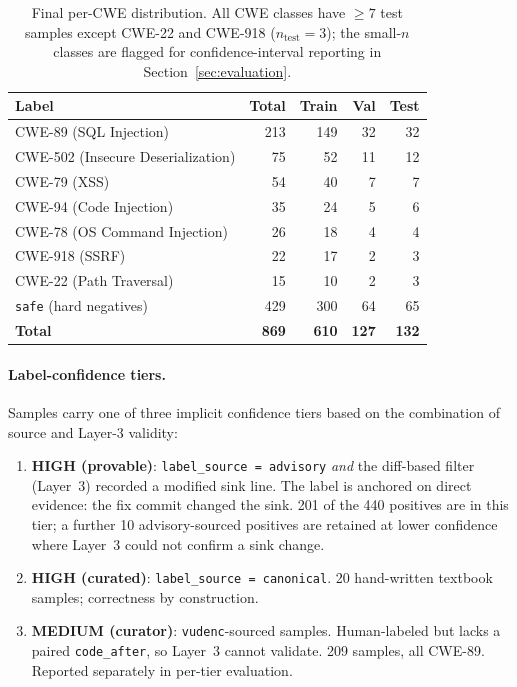\begin{table}[h]
\centering
\caption{Final per-CWE distribution. All CWE classes have $\ge 7$
test samples except CWE-22 and CWE-918 ($n_{\text{test}}=3$); the
small-$n$ classes are flagged for confidence-interval reporting in
Section~\ref{sec:evaluation}.}
\label{tab:per-cwe-counts}
\begin{tabular}{lrrrr}
\toprule
\textbf{Label} & \textbf{Total} & \textbf{Train} & \textbf{Val} & \textbf{Test} \\
\midrule
CWE-89 (SQL Injection)         & 213 & 149 & 32 & 32 \\
CWE-502 (Insecure Deserialization) & 75 & 52 & 11 & 12 \\
CWE-79 (XSS)                    & 54 & 40 & 7 & 7 \\
CWE-94 (Code Injection)         & 35 & 24 & 5 & 6 \\
CWE-78 (OS Command Injection)   & 26 & 18 & 4 & 4 \\
CWE-918 (SSRF)                  & 22 & 17 & 2 & 3 \\
CWE-22 (Path Traversal)         & 15 & 10 & 2 & 3 \\
\texttt{safe} (hard negatives)  & 429 & 300 & 64 & 65 \\
\midrule
\textbf{Total}                  & \textbf{869} & \textbf{610} & \textbf{127} & \textbf{132} \\
\bottomrule
\end{tabular}
\end{table}

\paragraph{Label-confidence tiers.}
Samples carry one of three implicit confidence tiers based on the
combination of source and Layer-3 validity:

\begin{enumerate}
\item \textbf{HIGH (provable)}: \texttt{label\_source = advisory}
  \emph{and} the diff-based filter (Layer~3) recorded a modified sink
  line. The label is anchored on direct evidence: the fix commit
  changed the sink. 201 of the 440 positives are in this tier; a
  further 10 advisory-sourced positives are retained at lower
  confidence where Layer~3 could not confirm a sink change.

\item \textbf{HIGH (curated)}: \texttt{label\_source = canonical}.
  20 hand-written textbook samples; correctness by construction.

\item \textbf{MEDIUM (curator)}: \texttt{vudenc}-sourced samples.
  Human-labeled but lacks a paired \texttt{code\_after}, so Layer~3
  cannot validate. 209 samples, all CWE-89. Reported separately in
  per-tier evaluation.
\end{enumerate}

